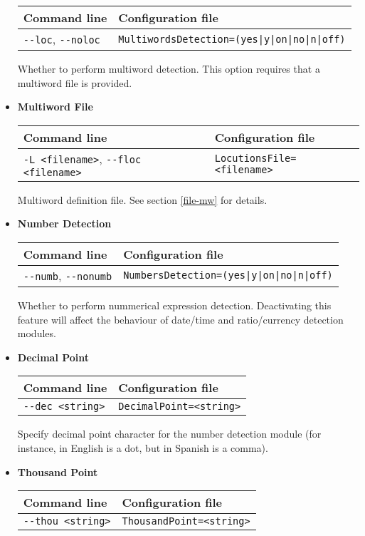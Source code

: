 \documentclass[a4paper]{book}
\begin{document}
\begin{itemize}
\begin{tabular}{|l|l|}
Command line       & Configuration file   \\ \hline
\verb#--loc#, \verb#--noloc#     & \verb#MultiwordsDetection=(yes|y|on|no|n|off)#  \\ \hline 
\end{tabular}

 Whether to perform multiword detection. This option requires that
 a multiword file is provided.

\item {\bf Multiword File}

\begin{tabular}{|l|l|}
Command line       & Configuration file   \\ \hline
\verb#-L <filename>#, \verb#--floc <filename># & \verb#LocutionsFile=<filename>#  \\ \hline
\end{tabular}

  Multiword definition file. See section \ref{file-mw} for details.

\item {\bf Number Detection}

\begin{tabular}{|l|l|}
Command line       & Configuration file   \\ \hline
\verb#--numb#, \verb#--nonumb#   & \verb#NumbersDetection=(yes|y|on|no|n|off)# \\ \hline
\end{tabular}

 Whether to perform nummerical expression detection. Deactivating this
 feature will affect the behaviour of date/time and ratio/currency
 detection modules.

\item {\bf Decimal Point}

\begin{tabular}{|l|l|}
Command line       & Configuration file   \\ \hline
\verb#--dec <string>#   & \verb#DecimalPoint=<string>#\\ \hline 
\end{tabular}

   Specify decimal point character for the number detection module
   (for instance, in English is a dot, but in Spanish is a comma).

\item {\bf Thousand Point} 

\begin{tabular}{|l|l|}
Command line       & Configuration file   \\ \hline
\verb#--thou <string>#  & \verb#ThousandPoint=<string>#  \\ \hline
\end{tabular}


\end{itemize}
\end{document}
